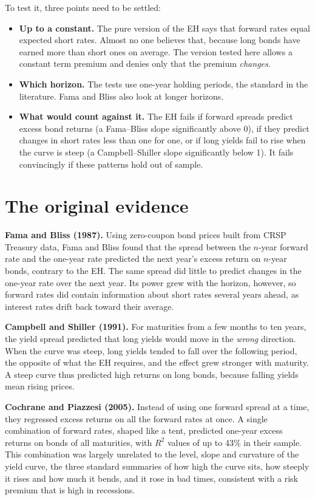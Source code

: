 To test it, three points need to be settled:

\begin{itemize}
  \item \textbf{Up to a constant.} The pure version of the EH says that forward rates equal expected short rates. Almost no one believes that, because long bonds have earned more than short ones on average. The version tested here allows a constant term premium and denies only that the premium \emph{changes}.
  \item \textbf{Which horizon.} The tests use one-year holding periods, the standard in the literature. Fama and Bliss also look at longer horizons.
  \item \textbf{What would count against it.} The EH fails if forward spreads predict excess bond returns (a Fama--Bliss slope significantly above 0), if they predict changes in short rates less than one for one, or if long yields fail to rise when the curve is steep (a Campbell--Shiller slope significantly below 1). It fails convincingly if these patterns hold out of sample.
\end{itemize}

\section{The original evidence}
\label{sec:07-evidence}

\textbf{Fama and Bliss (1987).} Using zero-coupon bond prices built from CRSP Treasury data, Fama and Bliss found that the spread between the $n$-year forward rate and the one-year rate predicted the next year's excess return on $n$-year bonds, contrary to the EH. The same spread did little to predict changes in the one-year rate over the next year. Its power grew with the horizon, however, so forward rates did contain information about short rates several years ahead, as interest rates drift back toward their average.

\textbf{Campbell and Shiller (1991).} For maturities from a few months to ten years, the yield spread predicted that long yields would move in the \emph{wrong} direction. When the curve was steep, long yields tended to fall over the following period, the opposite of what the EH requires, and the effect grew stronger with maturity. A steep curve thus predicted high returns on long bonds, because falling yields mean rising prices.

\textbf{Cochrane and Piazzesi (2005).} Instead of using one forward spread at a time, they regressed excess returns on all the forward rates at once. A single combination of forward rates, shaped like a tent, predicted one-year excess returns on bonds of all maturities, with $R^2$ values of up to 43\% in their sample. This combination was largely unrelated to the level, slope and curvature of the yield curve, the three standard summaries of how high the curve sits, how steeply it rises and how much it bends, and it rose in bad times, consistent with a risk premium that is high in recessions.

